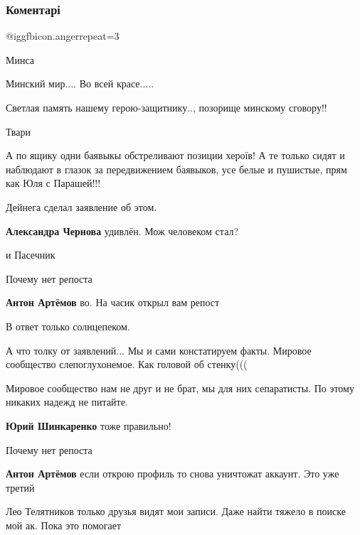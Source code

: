  
 
 
 
 
\subsubsection{Коментарі}
\label{sec:16_10_2020.fb.roman_chuni_muni.1.ukr_snajper.cmt}

\begin{itemize} %
 @igg{fbicon.anger}{repeat=3} 

Минса

Минский мир.... Во всей красе.....

Светлая память нашему герою-защитнику.., позорище минскому сговору!!

Твари


А по ящику одни баявыкы обстреливают позиции хероїв! А те только сидят и
наблюдают в глазок за передвижением баявыков, усе белые и пушистые, прям как Юля
с Парашей!!!

Дейнега сделал заявление об этом.

\begin{itemize} %
\textbf{Александра Чернова} удивлён. Мож человеком стал?

и Пасечник

Почему нет репоста

\textbf{Антон Артёмов} во. На часик открыл вам репост
\end{itemize} %

В ответ только солнцепеком.

А что толку от заявлений... Мы и сами констатируем факты. Мировое сообщество слепоглухонемое. Как головой об стенку(((

Мировое сообщество нам не друг и не брат, мы для них сепаратисты. По этому никаких надежд не питайте.

\textbf{Юрий Шинкаренко} тоже правильно!

Почему нет репоста

\textbf{Антон Артёмов} если открою профиль то снова уничтожат аккаунт. Это уже третий


Лео Телятников только друзья видят мои записи. Даже найти тяжело в поиске мой ак.
Пока это помогает

\end{itemize} %
